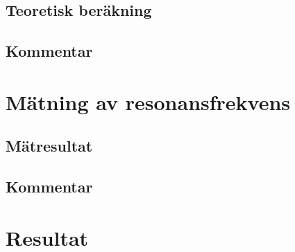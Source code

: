 \documentclass[11pt,a4paper]{article}
\begin{document}
\subsection{Teoretisk beräkning}\label{}

\subsection{Kommentar}\label{}


\section{Mätning av resonansfrekvens}\label{}

\subsection{Mätresultat}\label{}

\subsection{Kommentar}\label{}


\section{Resultat}\label{setup}
\end{document}

